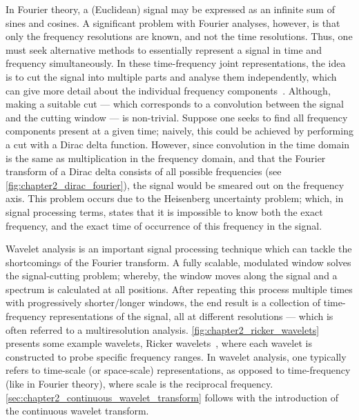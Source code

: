 In Fourier theory, a (Euclidean) signal may be expressed as an infinite sum of sines and cosines.
A significant problem with Fourier analyses, however, is that only the frequency resolutions are known, and not the time resolutions.
Thus, one must seek alternative methods to essentially represent a signal in time and frequency simultaneously.
In these time-frequency joint representations, the idea is to cut the signal into multiple parts and analyse them independently, which can give more detail about the individual frequency components~\cite{Mallat2008}.
Although, making a suitable cut --- which corresponds to a convolution between the signal and the cutting window --- is non-trivial.
Suppose one seeks to find all frequency components present at a given time; naively, this could be achieved by performing a cut with a Dirac delta function.
However, since convolution in the time domain is the same as multiplication in the frequency domain, and that the Fourier transform of a Dirac delta consists of all possible frequencies (see \cref{fig:chapter2_dirac_fourier}), the signal would be smeared out on the frequency axis.
This problem occurs due to the Heisenberg uncertainty problem; which, in signal processing terms, states that it is impossible to know both the exact frequency, and the exact time of occurrence of this frequency in the signal.

Wavelet analysis is an important signal processing technique which can tackle the shortcomings of the Fourier transform.
A fully scalable, modulated window solves the signal-cutting problem; whereby, the window moves along the signal and a spectrum is calculated at all positions.
After repeating this process multiple times with progressively shorter/longer windows, the end result is a collection of time-frequency representations of the signal, all at different resolutions --- which is often referred to a multiresolution analysis.
\cref{fig:chapter2_ricker_wavelets} presents some example wavelets, Ricker wavelets~\cite{Ricker1953}, where each wavelet is constructed to probe specific frequency ranges.
In wavelet analysis, one typically refers to time-scale (or space-scale) representations, as opposed to time-frequency (like in Fourier theory), where scale is the reciprocal frequency.
\cref{sec:chapter2_continuous_wavelet_transform} follows with the introduction of the continuous wavelet transform.





